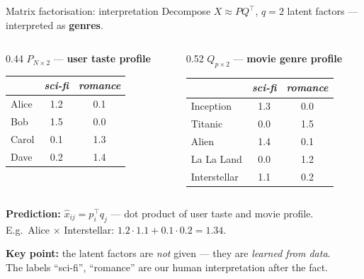 \documentclass[aspectratio=169,t]{beamer}
\begin{document}
\begin{frame}{Matrix factorisation: interpretation}
  Decompose $X \approx PQ^\top$, $q=2$ latent factors — interpreted as \textbf{genres}.

  \vspace{0.2cm}
  \begin{columns}[T]
    \begin{column}{0.44\textwidth}
      $P_{N\times 2}$ — \textbf{user taste profile}\\[0.15cm]
      \begin{tabular}{lcc}
        \toprule
        & \textit{sci-fi} & \textit{romance} \\
        \midrule
        Alice & 1.2 & 0.1 \\
        Bob   & 1.5 & 0.0 \\
        Carol & 0.1 & 1.3 \\
        Dave  & 0.2 & 1.4 \\
        \bottomrule
      \end{tabular}
    \end{column}
    \begin{column}{0.52\textwidth}
      $Q_{p\times 2}$ — \textbf{movie genre profile}\\[0.15cm]
      \begin{tabular}{lcc}
        \toprule
        & \textit{sci-fi} & \textit{romance} \\
        \midrule
        Inception    & 1.3 & 0.0 \\
        Titanic      & 0.0 & 1.5 \\
        Alien        & 1.4 & 0.1 \\
        La La Land   & 0.0 & 1.2 \\
        Interstellar & 1.1 & 0.2 \\
        \bottomrule
      \end{tabular}
    \end{column}
  \end{columns}

  \vspace{0.3cm}
  \textbf{Prediction:} $\hat x_{ij} = p_i^\top q_j$ — dot product of user taste and movie profile.\\[0.15cm]
  E.g.\ Alice $\times$ Interstellar: $1.2 \cdot 1.1 + 0.1 \cdot 0.2 = 1.34$.

  \vspace{0.15cm}
  \textbf{Key point:} the latent factors are \emph{not} given — they are \emph{learned from data}.\\
  The labels ``sci-fi'', ``romance'' are our human interpretation after the fact.
\end{frame}
\end{document}
